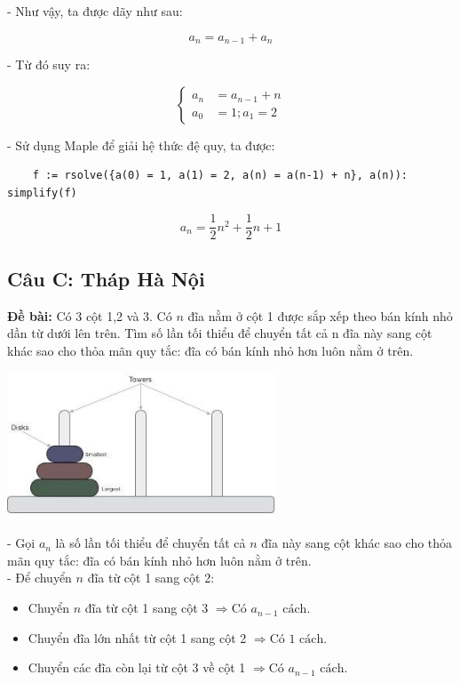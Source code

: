 \documentclass[12pt]{article}
\begin{document}
\begin{sloppypar}
- Như vậy, ta được dãy như sau:

\begin{equation*}
    a_{n} = a_{n - 1} + a_{n}
\end{equation*}

- Từ đó suy ra:

\[
    \begin{cases}
        a_{n} & = a_{n - 1} + n \\             
        a_{0} & = 1; a_{1} = 2   
    \end{cases}
    \]

- Sử dụng Maple để giải hệ thức đệ quy, ta được:

\begin{verbatim}
    f := rsolve({a(0) = 1, a(1) = 2, a(n) = a(n-1) + n}, a(n)): simplify(f)
\end{verbatim}

\begin{equation*}
    a_{n} = \frac{1}{2}n^{2} + \frac{1}{2}n + 1
\end{equation*}

\subsection{Câu C: Tháp Hà Nội}
\begin{tcolorbox}
    \textbf{Đề bài:} Có 3 cột 1,2 và 3. Có \(n\) đĩa nằm ở cột 1 được sắp xếp theo bán kính nhỏ dần từ dưới lên trên. Tìm số lần tối thiểu để chuyển tất cả n đĩa này sang cột khác sao cho thỏa mãn quy tắc:  đĩa có bán kính nhỏ hơn luôn nằm ở trên.
\end{tcolorbox}

\begin{center}
    {\includegraphics[width=8cm]{toh.png}}
\end{center}

- Gọi \(a_{n}\) là số lần tối thiểu để chuyển tất cả \(n\) đĩa này sang cột khác sao cho thỏa mãn quy tắc: đĩa có bán kính nhỏ hơn luôn nằm ở trên. \\
- Để chuyển \(n\) đĩa từ cột 1 sang cột 2:
\begin{itemize}
    \item Chuyển \(n\) đĩa từ cột 1 sang cột 3 \(\Rightarrow \text{Có } a_{n-1} \text{ cách.}\)
    \item Chuyển đĩa lớn nhất từ cột 1 sang cột 2 \(\Rightarrow \text{Có } 1 \text{ cách.}\)
    \item Chuyển các đĩa còn lại từ cột 3 về cột 1 \(\Rightarrow \text{Có } a_{n-1} \text{ cách.}\)
\end{itemize} 


\end{sloppypar}
\end{document}
